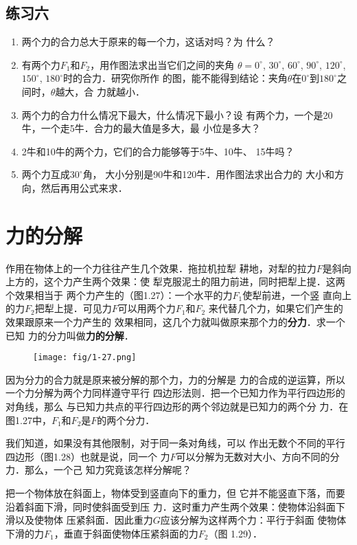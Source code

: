 \subsection*{练习六}
\begin{enumerate}
\item 两个力的合力总大于原来的每一个力，这话对吗？为
什么？

\item 有两个力$F_1$和$F_2$，用作图法求出当它们之间的夹角
$\theta =0^\circ$, $30^\circ$, $60^\circ$, $90^\circ$, $120^\circ$, $150^\circ$, $180^\circ$时的合力．研究你所作
的图，能不能得到结论：夹角$\theta$在$0^\circ$到$180^\circ$之间时，$\theta $越大，合
力就越小．
\item 两个力的合力什么情况下最大，什么情况下最小？设
有两个力，一个是20牛，一个走5牛．合力的最大值是多大，最
小位是多大？
\item 2牛和10牛的两个力，它们的合力能够等于5牛、10牛、
15牛吗？
\item   两个力互成$30^\circ$角， 大小分别是90牛和120牛．用作图法求出合力的
大小和方向，然后再用公式来求．
\end{enumerate}
    
\section{力的分解}
作用在物体上的一个力往往产生几个效果．拖拉机拉犁
耕地，对犁的拉力$F$是斜向上方的，这个力产生两个效果：使
犁克服泥土的阻力前进，同时把犁上提．这两个效果相当于
两个力产生的（图1.27）：一个水平的力$F_1$使犁前进，一个竖
直向上的力$F_2$把犁上提．可见力$F$可以用两个力$F_1$和$F_2$
来代替几个力，如果它们产生的效果跟原来一个力产生的
效果相同，这几个力就叫做原来那个力的\textbf{分力}．求一个已知
力的分力叫做\textbf{力的分解}．

\begin{figure}[htp]\centering
\texttt{[image: fig/1-27.png]}
\caption{}
\end{figure}

    因为分力的合力就是原来被分解的那个力，力的分解是
力的合成的逆运算，所以一个力分解为两个力同样遵守平行
四边形法则．把一个已知力作为平行四边形的对角线，那么
与已知力共点的平行四边形的两个邻边就是已知力的两个分
力．在图1.27中，$F_1$和$F_2$是$F$的两个分力．


    我们知道，如果没有其他限制，对于同一条对角线，可以
作出无数个不同的平行四边形（图1.28）也就是说，同一个
力$F$可以分解为无数对大小、方向不同的分力．那么，一个己
知力究竟该怎样分解呢？

    把一个物体放在斜面上，物体受到竖直向下的重力，但
它并不能竖直下落，而要沿着斜面下滑，同时使斜面受到压
力．这时重力产生两个效果：使物体沿斜面下滑以及使物体
压紧斜面．因此重力$G$应该分解为这样两个力：平行于斜面
使物体下滑的力$F_1$，垂直于斜面使物体压紧斜面的力$F_2$（图
1.29）．


